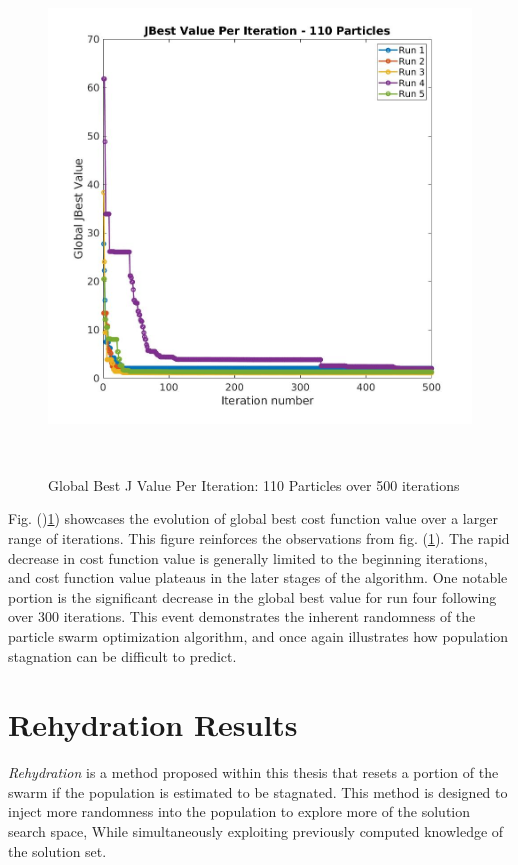 \begin{figure}[H]
    \includegraphics[width=\linewidth, height=13.5cm]{./jpgs/i500.jpg}
    \caption{Global Best J Value Per Iteration: 110 Particles over 500 iterations}
    \label{fig:gBestPer500Iter}
    \end{figure}

\noindent Fig. ()\ref{fig:gBestPer500Iter}) showcases the evolution of global best cost function value over a larger 
range of iterations. This figure reinforces the observations from fig. (\ref{fig:gBestPer500Iter}). The rapid decrease 
in cost function value is generally limited to the beginning iterations, and cost function value
plateaus in the later stages of the algorithm. One notable portion is the significant decrease in the global best 
value for run four following over 300 iterations. This event demonstrates the inherent randomness of the particle swarm 
optimization algorithm, and once again illustrates how population stagnation can be difficult to predict.

\section{Rehydration Results}

\noindent \textit{Rehydration} is a method proposed within this thesis that resets a portion of the swarm if the population is estimated to 
be stagnated. This method is designed to inject more randomness into the population to explore more of the solution search space, While
simultaneously exploiting previously computed knowledge of the solution set. 

